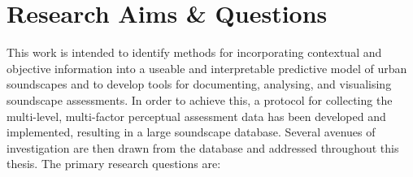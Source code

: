 

\section{Research Aims \& Questions}
This work is intended to identify methods for incorporating contextual and objective information into a useable and interpretable predictive model of urban soundscapes and to develop tools for documenting, analysing, and visualising soundscape assessments. In order to achieve this, a protocol for collecting the multi-level, multi-factor perceptual assessment data has been developed and implemented, resulting in a large soundscape database. Several avenues of investigation are then drawn from the database and addressed throughout this thesis. The primary research questions are:

